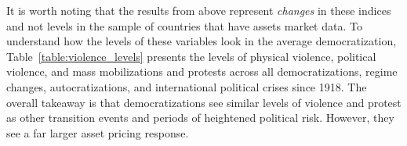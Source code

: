 It is worth noting that the results from above represent \textit{changes} in these indices and not levels in the sample of countries that have assets market data. To understand how the levels of these variables look in the average democratization, Table~\ref{table:violence_levels} presents the levels of physical violence, political violence, and mass mobilizations and protests across all democratizations, regime changes, autocratizations, and international political crises since 1918. The overall takeaway is that democratizations see similar levels of violence and protest as other transition events and periods of heightened political risk. However, they see a far larger asset pricing response.

